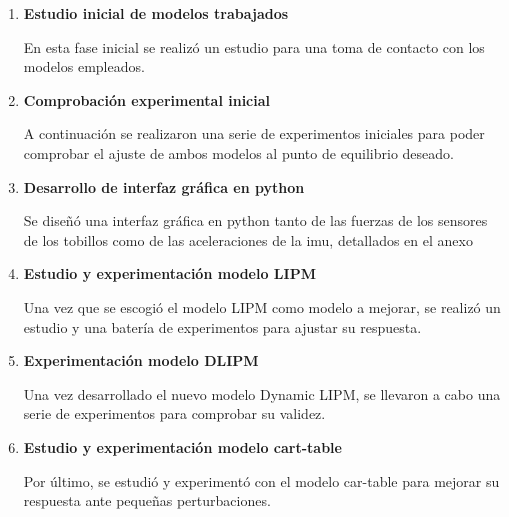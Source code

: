 \begin{enumerate}

\item \textbf{Estudio inicial de modelos trabajados}

En esta fase inicial se realizó un estudio para una toma de contacto con los modelos empleados.

\item \textbf{Comprobación experimental inicial}

A continuación se realizaron una serie de experimentos iniciales para poder comprobar el ajuste de ambos modelos al punto de equilibrio deseado.

\item \textbf{Desarrollo de interfaz gráfica en python}

Se diseñó una interfaz gráfica en python tanto de las fuerzas de los sensores de los tobillos como de las aceleraciones de la imu, detallados en el anexo %

\item \textbf{Estudio y experimentación modelo LIPM}

Una vez que se escogió el modelo LIPM como modelo a mejorar, se realizó un estudio y una batería de experimentos para ajustar su respuesta.

\item \textbf{Experimentación modelo DLIPM}

Una vez desarrollado el nuevo modelo Dynamic LIPM, se llevaron a cabo una serie de experimentos para comprobar su validez.

\item \textbf{Estudio y experimentación modelo cart-table}

Por último, se estudió y experimentó con el modelo car-table para mejorar su respuesta ante pequeñas perturbaciones.

\end{enumerate}

\afterpage{\null\newpage}
\newpage

